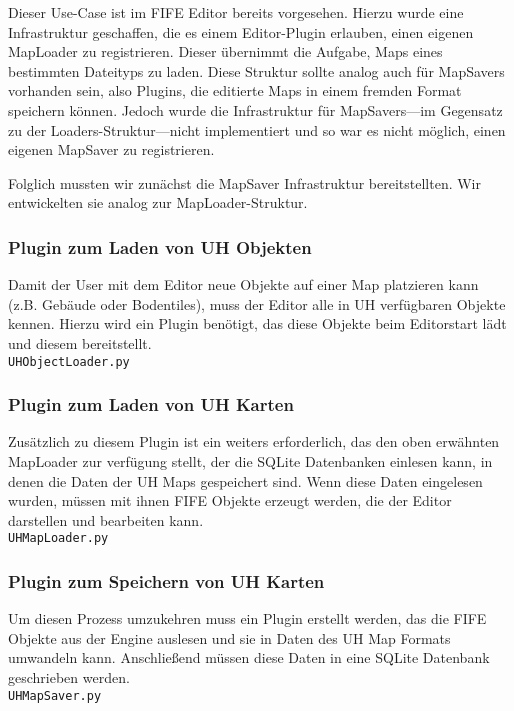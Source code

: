 Dieser Use-Case ist im FIFE Editor bereits vorgesehen. Hierzu wurde eine Infrastruktur geschaffen, die
es einem Editor-Plugin erlauben, einen eigenen MapLoader zu registrieren. Dieser übernimmt die
Aufgabe, Maps eines bestimmten Dateityps zu laden. Diese Struktur sollte analog
auch für MapSavers vorhanden sein, also Plugins, die editierte Maps in einem
fremden Format speichern können. Jedoch wurde die Infrastruktur für
MapSavers---im Gegensatz zu der Loaders-Struktur---nicht 
implementiert und so war es nicht möglich, einen eigenen MapSaver zu
registrieren.

Folglich mussten wir zunächst die MapSaver Infrastruktur bereitstellten. Wir
entwickelten sie analog zur MapLoader-Struktur.

\subsubsection{Plugin zum Laden von UH Objekten}
Damit der User mit dem Editor neue Objekte auf einer Map platzieren kann (z.B.
Gebäude oder Bodentiles), muss der Editor alle in UH verfügbaren Objekte kennen.
Hierzu wird ein Plugin benötigt, das diese Objekte beim Editorstart lädt und
diesem bereitstellt. \\
{\tt UHObjectLoader.py}

\subsubsection{Plugin zum Laden von UH Karten}
Zusätzlich zu diesem Plugin ist ein weiters erforderlich, das den oben erwähnten MapLoader
zur verfügung stellt, der die SQLite Datenbanken einlesen kann, in denen die Daten der
UH Maps gespeichert sind. Wenn diese Daten eingelesen wurden, müssen mit ihnen FIFE Objekte
erzeugt werden, die der Editor darstellen und bearbeiten kann. \\
{\tt UHMapLoader.py}


\subsubsection{Plugin zum Speichern von UH Karten}
Um diesen Prozess umzukehren muss ein Plugin erstellt werden, das die FIFE Objekte aus der
Engine auslesen und sie in Daten des UH Map Formats umwandeln kann. Anschließend müssen diese
Daten in eine SQLite Datenbank geschrieben werden. \\
{\tt UHMapSaver.py}

